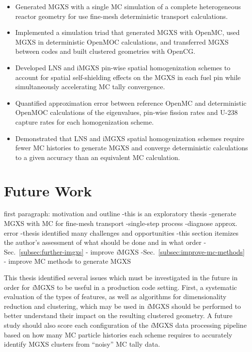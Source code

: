 \begin{itemize}
\item Generated MGXS with a single MC simulation of a complete heterogeneous reactor geometry for use fine-mesh deterministic transport calculations.
\item Implemented a simulation triad that generated MGXS with OpenMC, used MGXS in deterministic OpenMOC calculations, and transferred MGXS between codes and built clustered geometries with OpenCG.
\item Developed LNS and iMGXS pin-wise spatial homogenization schemes to account for spatial self-shielding effects on the MGXS in each fuel pin while simultaneously accelerating MC tally convergence.
\item Quantified approximation error between reference OpenMC and deterministic OpenMOC calculations of the eigenvalues, pin-wise fission rates and U-238 capture rates for each homogenization scheme.
\item Demonstrated that LNS and iMGXS spatial homogenization schemes require fewer MC histories to generate MGXS and converge deterministic calculations to a given accuracy than an equivalent MC calculation.
\end{itemize}

\section{Future Work}
\label{sec:chap12-future-work}

first paragraph: motivation and outline
-this is an exploratory thesis
  -generate MGXS with MC for fine-mesh transport
  -single-step process
  -diagnose approx. error
-thesis identified many challenges and opportunities
-this section itemizes the author's assessment of what should be done and in what order
  -Sec.~\ref{subsec:further-imgxs} - improve \textit{i}\ac{MGXS}
  -Sec.~\ref{subsec:improve-mc-methods} - improve \ac{MC} methods to generate \ac{MGXS}

This thesis identified several issues which must be investigated in the future in order for \textit{i}MGXS to be useful in a production code setting. First, a systematic evaluation of the types of features, as well as algorithms for dimensionality reduction and clustering, which may be used in \textit{i}MGXS should be performed to better understand their impact on the resulting clustered geometry. A future study should also score each configuration of the \textit{i}MGXS data processing pipeline based on how many MC particle histories each scheme requires to accurately identify MGXS clusters from ``noisy'' MC tally data. 


